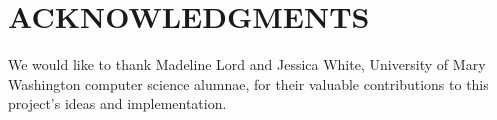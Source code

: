 \section*{ACKNOWLEDGMENTS}

We would like to thank Madeline Lord and Jessica White, University of Mary
Washington computer science alumnae, for their valuable contributions to this
project's ideas and implementation.
